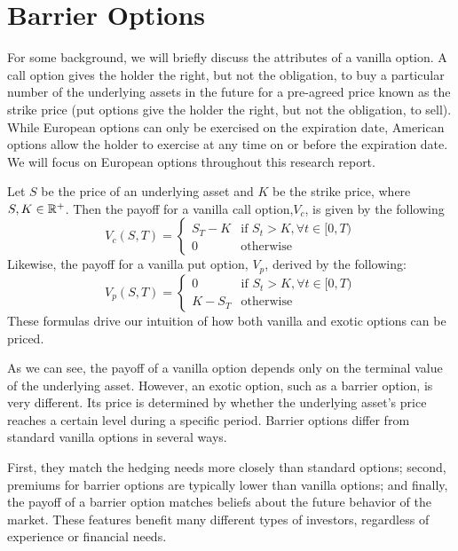 %
\chapter{Barrier Options}

\captionsetup[figure]{font=large}

For some background, we will briefly discuss the attributes of a vanilla option. A call option gives the holder the right, but not the obligation, to buy a particular number of the underlying assets in the future for a pre-agreed price known as the strike price (put options give the holder the right, but not the obligation, to sell). While European options can only be exercised on the expiration date, American options allow the holder to exercise at any time on or before the expiration date. We will focus on European options throughout this research report.

Let $S$ be the price of an underlying asset and $K$ be the strike price, where $S,K\in\amsbb{R}^+$. Then the payoff for a vanilla call option,$V_c$, is given by the following
\begin{equation}
	V_c(S,T)=\begin{cases}
		S_T-K  & \text{if }S_t>K,\forall t\in[0,T) \\
		0 & \text{otherwise}
	\end{cases}
\end{equation}
Likewise, the payoff for a vanilla put option, $V_p$, derived by the following:
\begin{equation}
	V_p(S,T)=\begin{cases}
		0 & \text{if }S_t>K,\forall t\in[0,T) \\
		K-S_T  & \text{otherwise}
	\end{cases}
\end{equation}
These formulas drive our intuition of how both vanilla and exotic options can be priced.

As we can see, the payoff of a vanilla option depends only on the terminal value of the underlying asset. However, an exotic option, such as a barrier option, is very different. Its price is determined by whether the underlying asset's price reaches a certain level during a specific period. Barrier options differ from standard vanilla options in several ways. 

First, they match the hedging needs more closely than standard options; second, premiums for barrier options are typically lower than vanilla options; and finally, the payoff of a barrier option matches beliefs about the future behavior of the market. These features benefit many different types of investors, regardless of experience or financial needs.

